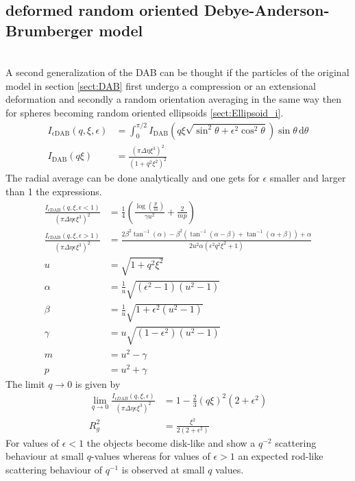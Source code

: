 \subsection{deformed random oriented Debye-Anderson-Brumberger model}
\label{sect:epsilonDAB}~\\
A second generalization of the DAB can be thought if the particles of the original model in section \ref{sect:DAB} first undergo a compression or an extensional deformation and secondly a random orientation averaging in the same way then for spheres becoming random oriented ellipsoids \ref{sect:Ellipsoid_i}.
\begin{align}
   \label{eq:DABaffPLUSrnd}
  I_{\epsilon\mathrm{DAB}}(q,\xi,\epsilon) &= \int_0^{\pi/2}I_\mathrm{DAB}\left(q\xi\sqrt{\sin^2\theta+\epsilon^2\cos^2\theta}\right) \sin\theta\, \mathrm{d}\theta \\
  I_\mathrm{DAB}(q\xi) &= \frac{\left(\pi\Delta\eta\xi^3\right)^2}{\left(1+q^2\xi^2\right)^2}
\end{align}
The radial average can be done analytically and one gets for $\epsilon$ smaller and larger than 1 the expressions.
\begin{align}\label{eq:DABaffPLUSrnd_eps_small}
   \frac{I_{\epsilon\mathrm{DAB}}(q,\xi,\epsilon{<}1)}{\left(\pi\Delta\eta\epsilon\xi^3\right)^2} &=\frac{1}{4} \left(\frac{\log \left(\frac{p}{m}\right)}{\gamma  u^2}+\frac{2}{m p}\right) \\
   \label{eq:DABaffPLUSrnd_eps_large}
   \frac{I_{\epsilon\mathrm{DAB}}(q,\xi,\epsilon{>}1)}{\left(\pi\Delta\eta\epsilon\xi^3\right)^2} &= \frac{2 \beta^2 \tan ^{-1}(\alpha)-\beta^2 \left(\tan ^{-1}(\alpha{-}\beta)+\tan ^{-1}(\alpha{+}\beta)\right)+\alpha}{2 u^2\alpha \left(
   \epsilon ^2 q^2 \xi ^2+1\right)} \\
   u &= \sqrt{1+q^2\xi^2} \\
  \alpha & =\frac{1}{u} \sqrt{\left(\epsilon^2-1\right)\left(u^2-1\right)}\\
  \beta &=  \frac{1}{u}\sqrt{1+\epsilon^2\left(u^2-1\right)}\\
  \gamma &= u\sqrt{\left(1-\epsilon^2\right)\left(u^2-1\right)} \\
  m &=u^2-\gamma \\
  p &= u^2+\gamma
\end{align}
The limit $q\to 0$ is given by
\begin{align}
  \lim_{q\to 0} \frac{I_{\epsilon DAB}(q,\xi,\epsilon)}{\left(\pi\Delta\eta\epsilon\xi^3\right)^2}& = 1 - \frac23 (q\xi)^2(2+\epsilon^2) \\
  R_g^2 & =  \frac{\xi^2}{2(2+\epsilon^2)}
\end{align}
For values of $\epsilon<1$ the objects become disk-like and show a $q^{-2}$ scattering behaviour at small $q$-values whereas for values of $\epsilon>1$ an expected rod-like scattering behaviour of $q^{-1}$ is observed at small $q$ values.


